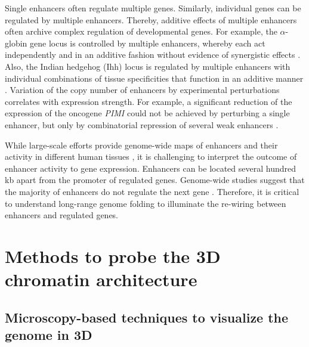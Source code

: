 \documentclass[a4paper,twoside=true,openright,parskip=full,chapterprefix=true,11pt,headings=normal,bibliography=totoc,listof=totoc,titlepage=on,captions=tableabove,draft=false]{scrreprt}
\theoremstyle{definition}
\theoremstyle{definition}
\theoremstyle{definition}
\theoremstyle{remark}
\begin{document}
Single enhancers often regulate multiple genes. Similarly, individual
genes can be regulated by multiple enhancers. Thereby, additive effects
of multiple enhancers often archive complex regulation of developmental
genes. For example, the \(\alpha\)-globin gene locus is controlled by
multiple enhancers, whereby each act independently and in an additive
fashion without evidence of synergistic effects \citep{Hay2016}. Also,
the Indian hedgehog (Ihh) locus is regulated by multiple enhancers with
individual combinations of tissue specificities that function in an
additive manner \citep{Will2017}. Variation of the copy number of
enhancers by experimental perturbations correlates with expression
strength. For example, a significant reduction of the expression of the
oncogene \emph{PIMI} could not be achieved by perturbing a single
enhancer, but only by combinatorial repression of several weak enhancers
\citep{Xie2017}.

While large-scale efforts provide genome-wide maps of enhancers and
their activity in different human tissues \citep{Andersson2014}, it is
challenging to interpret the outcome of enhancer activity to gene
expression. Enhancers can be located several hundred kb apart from the
promoter of regulated genes. Genome-wide studies suggest that the
majority of enhancers do not regulate the next gene \citep{Sanyal2012}.
Therefore, it is critical to understand long-range genome folding to
illuminate the re-wiring between enhancers and regulated genes.

\hypertarget{methods-to-probe-the-3d-chromatin-architecture}{%
\section{Methods to probe the 3D chromatin
architecture}\label{methods-to-probe-the-3d-chromatin-architecture}}

\hypertarget{microscopy-based-techniques-to-visualize-the-genome-in-3d}{%
\subsection{Microscopy-based techniques to visualize the genome in
3D}\label{microscopy-based-techniques-to-visualize-the-genome-in-3d}}
\end{document}
